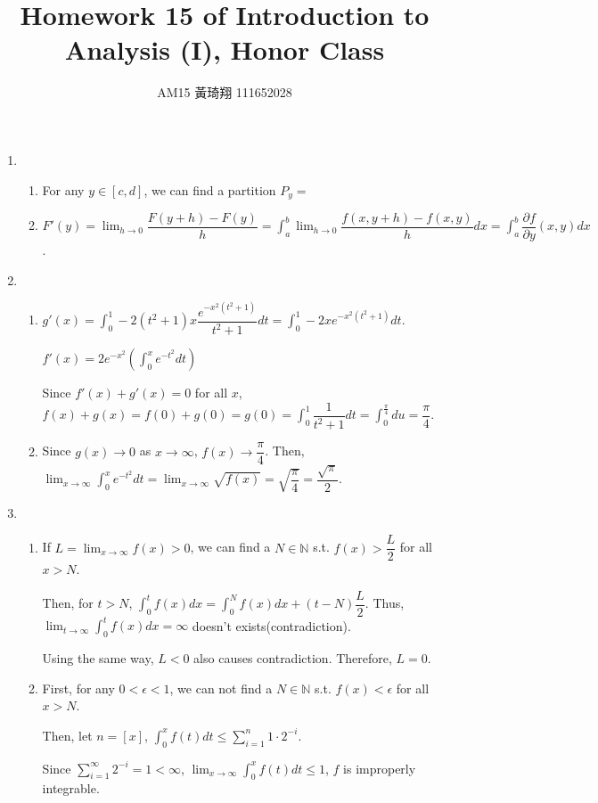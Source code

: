 \documentclass[12pt]{article}
\title{Homework 15 of Introduction to Analysis (I), Honor Class}
\author{AM15 黃琦翔 111652028}
\begin{document}
\maketitle
\begin{enumerate}
    \item \begin{enumerate}
        \item For any $y\in [c, d]$, we can find a partition $P_y = $

        \item $F'(y) = \displaystyle\lim_{h\to 0} \dfrac{F(y+h) - F(y)}{h} = \displaystyle\int_a^b \displaystyle\lim_{h\to 0} \dfrac{f(x, y+h) - f(x, y)}{h} dx = \displaystyle\int_a^b \dfrac{\partial f}{\partial y}(x, y) dx$.
    \end{enumerate}

    \item\begin{enumerate}
        \item $g'(x) = \displaystyle\int_0^1 -2(t^2+1)x\dfrac{e^{-x^2(t^2 + 1)}}{t^2+1}dt = \displaystyle\int_0^1 -2xe^{-x^2(t^2+1)} dt$.
        
        $f'(x) = 2e^{-x^2}(\displaystyle\int_0^x e^{-t^2} dt)$

        Since $f'(x) + g'(x) = 0$ for all $x$, $f(x) + g(x) = f(0) + g(0) = g(0) = \displaystyle\int_0^1 \dfrac{1}{t^2 + 1} dt =\displaystyle\int_0^\frac{\pi}{4} du = \dfrac{\pi}{4}$.

        \item Since $g(x) \to 0$ as $x \to \infty$, $f(x) \to \dfrac{\pi}{4}$.
        Then, $\displaystyle\lim_{x\to\infty} \displaystyle\int_0^x e^{-t^2} dt = \displaystyle\lim_{x\to\infty} \sqrt{f(x)} = \sqrt{\dfrac{\pi}{4}} = \dfrac{\sqrt{\pi}}{2}$.
    \end{enumerate}

    \item \begin{enumerate}
        \item If $L = \lim_{x \to \infty} f(x) > 0$, we can find a $N\in\mathbb{N}$ s.t. $f(x) > \dfrac{L}{2}$ for all $x > N$.
        
        Then, for $t > N$, $\displaystyle\int_0^t f(x) dx = \displaystyle\int_0^N f(x) dx + (t-N)\dfrac{L}{2}$.
        Thus, $\displaystyle\lim_{t\to\infty} \displaystyle\int_0^t f(x) dx = \infty$ doesn't exists(contradiction).

        Using the same way, $L < 0$ also causes contradiction.
        Therefore, $L = 0$.

        \item First, for any $0<\epsilon < 1$, we can not find a $N \in \mathbb{N}$ s.t. $f(x) < \epsilon$ for all $x > N$.
        
        Then, let $n = [x]$, $\displaystyle\int_0^x f(t) dt \leq \displaystyle\sum_{i=1}^{n} 1 \cdot 2^{-i}$.

        Since $\displaystyle\sum_{i=1}^{\infty} 2^{-i} = 1 < \infty$, $\displaystyle\lim_{x \to \infty}\displaystyle\int_0^x f(t) dt \leq 1$, $f$ is improperly integrable.
    \end{enumerate}
\end{enumerate}
\end{document}
